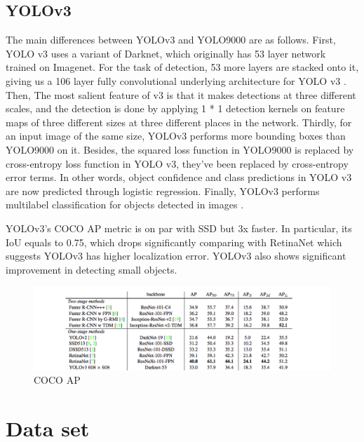 \documentclass{article}
\begin{document}
\subsection{YOLOv3}

The main differences between YOLOv3 and YOLO9000 are as follows. First, YOLO v3 uses a variant of Darknet, which originally has 53 layer network trained on Imagenet. For the task of detection, 53 more layers are stacked onto it, giving us a 106 layer fully convolutional underlying architecture for YOLO v3 \cite{YOLOv3}. Then, The most salient feature of v3 is that it makes detections at three different scales, and the detection is done by applying 1 * 1 detection kernels on feature maps of three different sizes at three different places in the network. Thirdly, for an input image of the same size, YOLOv3 performs more bounding boxes than YOLO9000 on it. Besides, the squared loss function in YOLO9000 is replaced by cross-entropy loss function in YOLO v3, they’ve been replaced by cross-entropy error terms. In other words, object confidence and class predictions in YOLO v3 are now predicted through logistic regression. Finally, YOLOv3 performs multilabel classification for objects detected in images \cite{YOLOv3}.

YOLOv3's COCO AP metric is on par with SSD but 3x faster. In particular, its IoU equals to 0.75, which drops significantly comparing with RetinaNet which suggests YOLOv3 has higher localization error. YOLOv3 also shows significant improvement in detecting small objects.

\begin{figure}[h]
\centering
\includegraphics[scale=0.4]{COCO.png}
\caption{COCO AP\cite{YOLOv3}}
\label{fig:COCO AP}
\end{figure}










\section{Data set}
\end{document}
